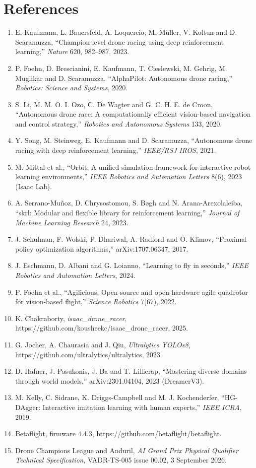 \documentclass{article}
\begin{document}
\section*{References}
\small
\begin{enumerate}[leftmargin=*]
\item E. Kaufmann, L. Bauersfeld, A. Loquercio, M. Müller, V. Koltun and D. Scaramuzza, ``Champion-level drone racing using deep reinforcement learning,'' \emph{Nature} 620, 982--987, 2023.
\item P. Foehn, D. Brescianini, E. Kaufmann, T. Cieslewski, M. Gehrig, M. Muglikar and D. Scaramuzza, ``AlphaPilot: Autonomous drone racing,'' \emph{Robotics: Science and Systems}, 2020.
\item S. Li, M. M. O. I. Ozo, C. De Wagter and G. C. H. E. de Croon, ``Autonomous drone race: A computationally efficient vision-based navigation and control strategy,'' \emph{Robotics and Autonomous Systems} 133, 2020.
\item Y. Song, M. Steinweg, E. Kaufmann and D. Scaramuzza, ``Autonomous drone racing with deep reinforcement learning,'' \emph{IEEE/RSJ IROS}, 2021.
\item M. Mittal et al., ``Orbit: A unified simulation framework for interactive robot learning environments,'' \emph{IEEE Robotics and Automation Letters} 8(6), 2023 (Isaac Lab).
\item A. Serrano-Muñoz, D. Chrysostomou, S. Bøgh and N. Arana-Arexolaleiba, ``skrl: Modular and flexible library for reinforcement learning,'' \emph{Journal of Machine Learning Research} 24, 2023.
\item J. Schulman, F. Wolski, P. Dhariwal, A. Radford and O. Klimov, ``Proximal policy optimization algorithms,'' arXiv:1707.06347, 2017.
\item J. Eschmann, D. Albani and G. Loianno, ``Learning to fly in seconds,'' \emph{IEEE Robotics and Automation Letters}, 2024.
\item P. Foehn et al., ``Agilicious: Open-source and open-hardware agile quadrotor for vision-based flight,'' \emph{Science Robotics} 7(67), 2022.
\item K. Chakraborty, \emph{isaac\_drone\_racer}, https://github.com/kousheekc/isaac\_drone\_racer, 2025.
\item G. Jocher, A. Chaurasia and J. Qiu, \emph{Ultralytics YOLOv8}, https://github.com/ultralytics/ultralytics, 2023.
\item D. Hafner, J. Pasukonis, J. Ba and T. Lillicrap, ``Mastering diverse domains through world models,'' arXiv:2301.04104, 2023 (DreamerV3).
\item M. Kelly, C. Sidrane, K. Driggs-Campbell and M. J. Kochenderfer, ``HG-DAgger: Interactive imitation learning with human experts,'' \emph{IEEE ICRA}, 2019.
\item Betaflight, firmware 4.4.3, https://github.com/betaflight/betaflight.
\item Drone Champions League and Anduril, \emph{AI Grand Prix Physical Qualifier Technical Specification}, VADR-TS-005 issue 00.02, 3 September 2026.
\end{enumerate}
\appendix
\end{document}
